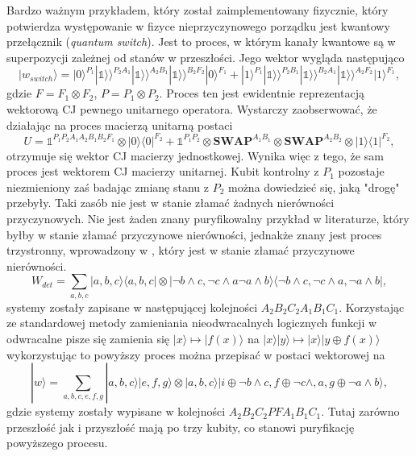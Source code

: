 \documentclass[10pt]{article} %
\newcommand{\Ket}[1]{|#1\rangle}
\newcommand{\Bra}[1]{\langle#1|}
\newcommand{\KKet}[1]{|#1\rangle\rangle}
\newcommand{\I}{\mathbb{1}}
\begin{document}
Bardzo ważnym przykładem, który został zaimplementowany fizycznie, który potwierdza występowanie w fizyce nieprzyczynowego porządku jest kwantowy przełącznik (\textit{quantum switch}). Jest to proces, w którym kanały kwantowe są w superpozycji zależnej od stanów w przeszłości. Jego wektor wygląda następująco
\begin{equation}
\Ket{w_{switch}} = \Ket{0}^{P_1}\KKet{\I}^{P_2A_1}\KKet{\I}^{A_2B_1}\KKet{\I}^{B_2F_2}\Ket{0}^{F_1}+\Ket{1}^{P_1}\KKet{\I}^{P_2B_1}\KKet{\I}^{B_2A_1}\KKet{\I}^{A_2F_2}\Ket{1}^{F_1},
\end{equation} gdzie $F = F_1 \otimes F_2$, $P = P_1 \otimes P_2$. Proces ten jest ewidentnie reprezentacją wektorową CJ pewnego unitarnego operatora. Wystarczy zaobserwować, że działając na proces macierzą unitarną postaci
\begin{equation}
U = \I^{P_1P_2A_1A_2B_1B_2F_1}\otimes\Ket{0}\Bra{0}^{F_2} + \I^{P_1P_2} \otimes \mathbf{SWAP}^{A_1B_1} \otimes \mathbf{SWAP}^{A_2B_2} \otimes \Ket{1}\Bra{1}^{F_2},
\end{equation}
otrzymuje się wektor CJ macierzy jednostkowej. Wynika więc z tego, że sam proces jest wektorem CJ macierzy unitarnej.
Kubit kontrolny z $P_1$ pozostaje niezmieniony zaś badając zmianę stanu z $P_2$ można dowiedzieć się, jaką "drogę" przebyły. Taki zasób nie jest w stanie złamać żadnych nierówności przyczynowych.
Nie jest żaden znany puryfikowalny przykład w literaturze, który byłby w stanie złamać przyczynowe nierówności, jednakże znany jest proces trzystronny, wprowadzony w \cite{logic}, który jest w stanie złamać przyczynowe nierówności. 
\begin{equation}
W_{det} = \sum_{a,b,c} \Ket{a,b,c}\Bra{a,b,c} \otimes \Ket{\neg b \land c, \neg c\land a \neg a\land b} \Bra{\neg b \land c, \neg c\land a ,\neg a\land b},
\end{equation} systemy zostały zapisane w następującej kolejności $A_2B_2C_2A_1B_1C_1$. Korzystając ze standardowej metody zamieniania nieodwracalnych logicznych funkcji w odwracalne pisze się zamienia się
$\Ket{x} \mapsto \Ket{f(x)}$ na $\Ket{x}\Ket{y} \mapsto \Ket{x}\Ket{y \oplus f(x)}$ wykorzystując to powyższy proces można przepisać w postaci wektorowej na
\begin{equation}
\Ket{w} = \sum_{a,b,c,e,f,g} \Ket{a,b,c}\Ket{e,f,g} \otimes \Ket{a,b,c}\Ket{i \oplus \neg b \land c,f \oplus \neg c\land, a , g\oplus \neg a\land b},
\end{equation} gdzie systemy zostały wypisane w kolejności $A_2B_2C_2PFA_1B_1C_1$. Tutaj zarówno przeszłość jak i przyszłość mają po trzy kubity, co stanowi puryfikację powyższego procesu.
\end{document}
